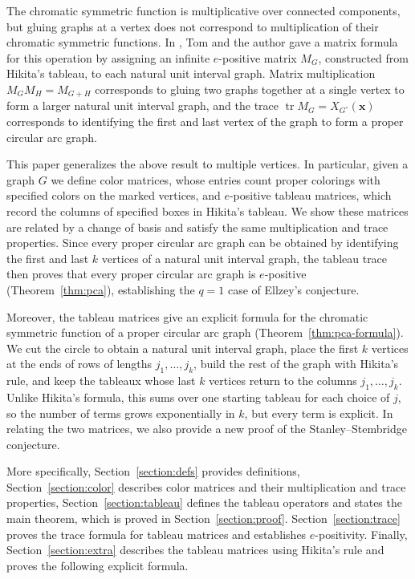 \documentclass[12pt]{article}
\theoremstyle{plain}
\theoremstyle{definition}
\theoremstyle{remark}
\begin{document}
The chromatic symmetric function is multiplicative over connected
components, but gluing graphs at a vertex does not correspond to
multiplication of their chromatic symmetric functions. In
\cite{singlegluing}, Tom and the author gave a matrix formula for this
operation by assigning an infinite $e$-positive matrix $M_G$, constructed from Hikita's tableau, to each natural unit interval graph. Matrix multiplication $M_GM_H=M_{G+H}$ corresponds to gluing two graphs together at a single vertex to form a larger natural unit interval graph, and the trace $\operatorname{tr} M_G=X_{G^\circ}(\bm x)$ corresponds to identifying the first and last vertex of the graph to form a proper circular arc graph.

This paper generalizes the above result to multiple vertices. In particular, given a graph $G$ we define color
matrices, whose entries count proper colorings with specified colors on
the marked vertices, and $e$-positive tableau matrices, which record the columns of
specified boxes in Hikita's tableau. We show these matrices are related by a change of basis and satisfy the same multiplication and trace properties. Since every proper circular arc graph can be obtained by identifying the first and last $k$ vertices of a natural unit interval graph, the tableau
trace then proves that every proper circular arc graph is $e$-positive
(Theorem~\ref{thm:pca}), establishing the $q=1$ case of Ellzey's
conjecture.

Moreover, the tableau matrices give an explicit formula for the chromatic symmetric function of a proper circular arc graph (Theorem~\ref{thm:pca-formula}). We cut the circle to obtain a natural unit interval graph, place the first $k$ vertices at the ends of rows of lengths $j_1,\dots,j_k$, build the rest of the graph with Hikita's rule, and keep the tableaux whose last $k$ vertices return to the columns $j_1,\dots,j_k$. Unlike Hikita's formula, this sums over one starting tableau for each choice of $j$, so the number of terms grows exponentially in $k$, but every term is explicit. In relating the two matrices, we also provide a new proof
of the Stanley--Stembridge conjecture.

More specifically, Section~\ref{section:defs} provides definitions, Section~\ref{section:color} describes color matrices and their multiplication and trace properties, Section~\ref{section:tableau}
defines the tableau operators and states the main theorem, which is proved in Section~\ref{section:proof}. Section~\ref{section:trace} proves
the trace formula for tableau matrices and establishes $e$-positivity. Finally, Section~\ref{section:extra} describes the tableau matrices using Hikita's rule and proves the following explicit formula.
\end{document}
